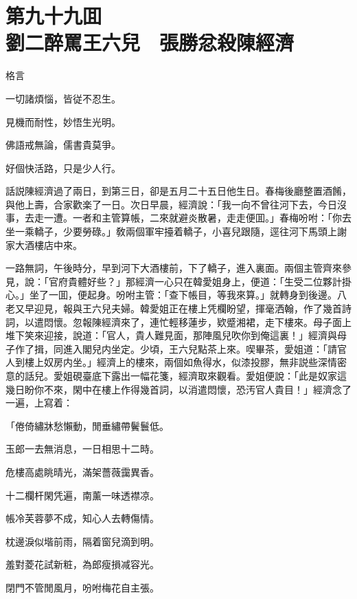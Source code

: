 
\chapter*{第九十九囬　\\劉二醉罵王六兒　張勝忿殺陳經濟}


格言

\begin{myquote}
一切諸煩惱，皆従不忍生。

見機而耐性，妙悟生光明。

佛語戒無論，儒書貴莫爭。

好個快活路，只是少人行。
\end{myquote}

話説陳經濟過了兩日，到第三日，卻是五月二十五日他生日。春梅後廳整置酒餚，與他上壽，合家歡楽了一日。次日早晨，經濟說：「我一向不曾往河下去，今日沒事，去走一遭。一者和主管算帳，二來就避炎散暑，走走便囬。」春梅吩咐：「你去坐一乘轎子，少要勞碌。」敎兩個軍牢擡着轎子，小喜兒跟隨，逕往河下馬頭上謝家大酒樓店中來。

一路無詞，午後時分，早到河下大酒樓前，下了轎子，進入裏面。兩個主管齊來參見，說：「官府貴體好些？」那經濟一心只在韓愛姐身上，便道：「生受二位夥計掛心。」坐了一囬，便起身。吩咐主管：「查下帳目，等我來算。」就轉身到後邊。八老又早迎見，報與王六兒夫婦。韓愛姐正在樓上凭欄盼望，揮毫洒翰，作了幾首詩詞，以遣悶懷。忽報陳經濟來了，連忙輕移蓮步，欵蹙湘裙，走下樓來。母子面上堆下笑來迎接，說道：「官人，貴人難見面，那陣風兒吹你到俺這裏！」經濟與母子作了揖，同進入閣兒内坐定。少頃，王六兒點茶上來。喫畢茶，愛姐道：「請官人到樓上奴房内坐。」經濟上的樓來，兩個如魚得水，似漆投膠，無非説些深情密意的話兒。愛姐硯臺底下露出一幅花箋，經濟取來觀看。愛姐便說：「此是奴家這幾日盼你不來，閑中在樓上作得幾首詞，以消遣悶懷，恐汚官人貴目！」經濟念了一遍，上寫着：

\begin{myquote}
「倦倚繡牀愁懶動，閒垂繡帶鬢鬟低。

玉郎一去無消息，一日相思十二時。


危樓高處眺晴光，滿架薔薇靄異香。

十二欄杆閑凭遍，南薰一味透襟凉。


帳冷芙蓉夢不成，知心人去轉傷情。

枕邊淚似堦前雨，隔着窗兒滴到明。


羞對菱花試新粧，為郎瘦損减容光。

閉門不管閒風月，吩咐梅花自主張。

\end{myquote}

